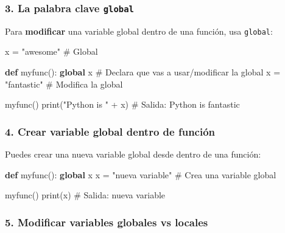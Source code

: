 \documentclass[
  doc,
  floatsintext,
  longtable,
  a4paper,
  nolmodern,
  notxfonts,
  notimes,
  12pt,
  colorlinks=true,linkcolor=blue,citecolor=blue,urlcolor=blue]{apa7}
\newenvironment{Shaded}{\begin{snugshade}}{\end{snugshade}}
\newcommand{\BuiltInTok}[1]{\textcolor[rgb]{0.00,0.23,0.31}{#1}}
\newcommand{\CommentTok}[1]{\textcolor[rgb]{0.37,0.37,0.37}{#1}}
\newcommand{\KeywordTok}[1]{\textcolor[rgb]{0.00,0.23,0.31}{\textbf{#1}}}
\newcommand{\NormalTok}[1]{\textcolor[rgb]{0.00,0.23,0.31}{#1}}
\newcommand{\OperatorTok}[1]{\textcolor[rgb]{0.37,0.37,0.37}{#1}}
\newcommand{\StringTok}[1]{\textcolor[rgb]{0.13,0.47,0.30}{#1}}
\begin{document}
\subsubsection{\texorpdfstring{3. La palabra clave
\texttt{global}}{3. La palabra clave global}}\label{la-palabra-clave-global}

Para \textbf{modificar} una variable global dentro de una función, usa
\texttt{global}:

\begin{Shaded}
\begin{Highlighting}[]
\NormalTok{x }\OperatorTok{=} \StringTok{"awesome"}  \CommentTok{\# Global}

\KeywordTok{def}\NormalTok{ myfunc():}
    \KeywordTok{global}\NormalTok{ x  }\CommentTok{\# Declara que vas a usar/modificar la global}
\NormalTok{    x }\OperatorTok{=} \StringTok{"fantastic"}  \CommentTok{\# Modifica la global}

\NormalTok{myfunc()}
\BuiltInTok{print}\NormalTok{(}\StringTok{"Python is "} \OperatorTok{+}\NormalTok{ x)  }\CommentTok{\# Salida: Python is fantastic}
\end{Highlighting}
\end{Shaded}

\subsubsection{4. Crear variable global dentro de
función}\label{crear-variable-global-dentro-de-funciuxf3n}

Puedes crear una nueva variable global desde dentro de una función:

\begin{Shaded}
\begin{Highlighting}[]
\KeywordTok{def}\NormalTok{ myfunc():}
    \KeywordTok{global}\NormalTok{ x}
\NormalTok{    x }\OperatorTok{=} \StringTok{"nueva variable"}  \CommentTok{\# Crea una variable global}

\NormalTok{myfunc()}
\BuiltInTok{print}\NormalTok{(x)  }\CommentTok{\# Salida: nueva variable}
\end{Highlighting}
\end{Shaded}

\subsubsection{5. Modificar variables globales vs
locales}\label{modificar-variables-globales-vs-locales}
\end{document}
